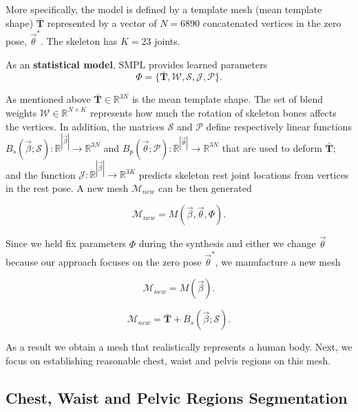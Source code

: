\documentclass[runningheads, orivec]{llncs}
\begin{document}
More specifically, the model is defined by a template mesh (mean template 
shape) $\mathbf{\bar{T}}$ represented by a vector of $N = 6890$ concatenated 
vertices in the zero pose, $\vec{\theta}^*$. The skeleton has $K = 23$ joints.

As an \textbf{statistical model}, SMPL provides learned parameters
\begin{equation} \label{eq:smpl_params}
\Phi = \{\mathbf{\bar{T}}, \mathcal{W}, \mathcal{S}, \mathcal{J}, 
\mathcal{P}\}.
\end{equation}

As mentioned above $\mathbf{\bar{T}} \in \mathbb{R}^{3N}$  is the mean template 
shape. The set of blend weights $\mathcal{W} \in \mathbb{R}^{N \times K}$ 
represents 
how much the rotation of 
skeleton bones affects
the vertices. In addition, the matrices $\mathcal{S}$ and $\mathcal{P}$ define 
respectively linear functions $B_s(\vec{\beta}; \mathcal{S}): 
\mathbb{R}^{|\vec{\beta}|} \to 
\mathbb{R}^{3N}$ and $B_p(\vec{\theta}; \mathcal{P}): 
\mathbb{R}^{|\vec{\theta}|} \to 
\mathbb{R}^{3N}$ that are used to deform $\mathbf{\bar{T}}$; and the function 
$\mathcal{J}: \mathbb{R}^{|\vec{\beta}|} \to \mathbb{R}^{3K}$ predicts skeleton 
rest joint locations from vertices in the rest 
pose. A new mesh $\mathcal{M}_{new}$ can be then generated

\begin{equation}\label{eq:gen_mesh}
\mathcal{M}_{new} = M(\vec{\beta}, \vec{\theta}, \Phi).
\end{equation}

Since we held fix parameters $\Phi$ during the synthesis and either we change 
$\vec{\theta}$ because our approach focuses on the zero pose $\vec{\theta}^*$, 
we manufacture a new mesh

\begin{equation}\label{eq:gen_mesh_only_shape}
\mathcal{M}_{new} = M(\vec{\beta}).
\end{equation}

\begin{equation}\label{eq:gen_new_mesh}
\mathcal{M}_{new} = \mathbf{\bar{T}} + B_s(\vec{\beta}; \mathcal{S}).
\end{equation}

As a result we obtain a mesh that realistically represents a human body. Next, 
we focus on establishing reasonable chest, waist and pelvis regions on this 
mesh.

\subsection{Chest, Waist and Pelvic Regions 
Segmentation}\label{subsec:three_regions}
\end{document}
